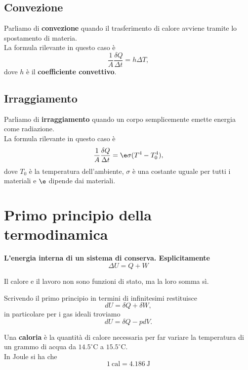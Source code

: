 \subsection{Convezione}
Parliamo di \textbf{convezione} quando il trasferimento di calore avviene tramite lo spostamento di materia.\\ La formula rilevante in questo caso \`e
\[\frac1A\frac{\delta Q}{\Delta t}=h\Delta T,\]
dove $h$ \`e il \textbf{coefficiente convettivo}.

\subsection{Irraggiamento}
Parliamo di \textbf{irraggiamento} quando un corpo semplicemente emette energia come radiazione.\\ 
La formula rilevante in questo caso \`e
\[\frac1A\frac{\delta Q}{\Delta t}=\e \sigma(T^4-T_0^4),\]
dove $T_0$ \`e la temperatura dell'ambiente, $\sigma$ \`e una costante uguale per tutti i materiali e $\e$ dipende dai materiali.

\section{Primo principio della termodinamica}

\begin{fact}
\textbf{L'energia interna di un sistema di conserva. Esplicitamente}
\[\boxed{\Delta U=Q+W}\]
\end{fact}

\begin{remark}
Il calore e il lavoro non sono funzioni di stato, ma la loro somma s\`i.
\end{remark}

\begin{remark}
Scrivendo il primo principio in termini di infinitesimi restituisce
\[dU=\delta Q+\delta W,\]
in particolare per i gas ideali troviamo
\[dU=\delta Q-pdV.\]
\end{remark}



\begin{definition}[Caloria]
Una \textbf{caloria} \`e la quantit\`a di calore necessaria per far variare la temperatura di un grammo di acqua da $14.5^\circ\mathrm{C}$ a $15.5^\circ\mathrm{C}$.\\
In Joule si ha che
\[\boxed{1\ \mathrm{cal}=4.186\ \mathrm{J}}\]
\end{definition}


